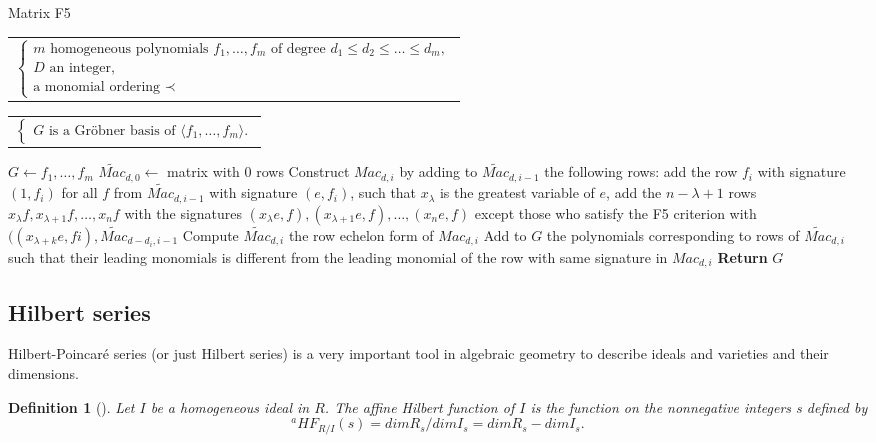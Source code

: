 \documentclass[english]{article}
\newtheorem{definition}{Definition}[section]
\begin{document}
		\begin{algorithm}
			\caption{Matrix F5}\label{alg:matrix_f5}
			\begin{algorithmic}[1]
				\Require 
				\begin{tabular}[t]{@{}l@{}}
					$\left\{ 
					\begin{array}{l}
						m \text{ homogeneous polynomials } f_1, \dots, f_m \text{ of degree } d_1 \leq d_2 \leq \dots \leq d_m, \\
						D \text{ an integer}, \\
						\text{a monomial ordering } \prec
					\end{array}
					\right.$
				\end{tabular}
				\Ensure 
				\begin{tabular}[t]{@{}l@{}}
					$\left\{ 
					\begin{array}{l}
						G \text{ is a Gröbner basis of } \langle f_1,\dots,f_m \rangle.
					\end{array}
					\right.$
				\end{tabular}
				\State $G \gets {f_1,\dots,f_m}$
					\State $\widetilde{Mac}_{d, 0} \gets$ matrix with 0 rows
						\State Construct ${Mac}_{d, i}$ by adding to $\widetilde{Mac}_{d, i-1}$ the following rows:
							\State add the row $f_i$ with signature $(1, f_i)$
						\EndIf
							for all $f$ from $\widetilde{Mac}_{d, i-1}$ with signature $(e, f_i)$, such that $x_\lambda$ is the greatest variable of $e$, add the $n - \lambda + 1$ rows $x_\lambda f,x_{\lambda + 1}f,\dots,x_n f$ with the signatures $(x_\lambda e, f),(x_{\lambda + 1}e, f),\dots,(x_n e, f)$ except those who satisfy the F5 criterion with $((x_{\lambda + k}e, fi), \widetilde{Mac}_{d-d_i, i-1}$
						\EndIf
						\State Compute $\widetilde{Mac}_{d, i}$ the row echelon form of ${Mac}_{d, i}$
						\State Add to $G$ the polynomials corresponding to rows of $\widetilde{Mac}_{d, i}$ such that their leading
						\State monomials is different from the leading monomial of the row with 
						\State same signature in ${Mac}_{d, i}$
				 	\EndFor
				\EndFor
				\State \textbf{Return} $G$
			\end{algorithmic}
		\end{algorithm}
		
		\subsection{Hilbert series}
		Hilbert-Poincaré series (or just Hilbert series) is a very important tool in algebraic geometry to describe ideals and varieties and their dimensions.
		\begin{definition}[\cite{CLS}]
			Let $I$ be a homogeneous ideal in $R$. The affine Hilbert function of $I$ is the function on the nonnegative integers s defined by
			$$
				{}^a HF_{R/I}(s) = dim R_{s} / dim I_{s} = dim R_{s} - dim I_{s}.
			$$
		\end{definition}
		
\end{document}

